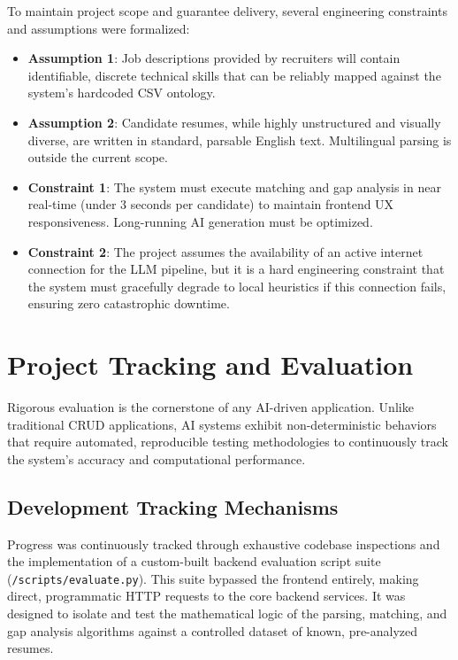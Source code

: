 \documentclass[12pt,a4paper]{report}
\begin{document}
To maintain project scope and guarantee delivery, several engineering constraints and assumptions were formalized:
\begin{itemize}
    \item \textbf{Assumption 1}: Job descriptions provided by recruiters will contain identifiable, discrete technical skills that can be reliably mapped against the system's hardcoded CSV ontology.
    \item \textbf{Assumption 2}: Candidate resumes, while highly unstructured and visually diverse, are written in standard, parsable English text. Multilingual parsing is outside the current scope.
    \item \textbf{Constraint 1}: The system must execute matching and gap analysis in near real-time (under 3 seconds per candidate) to maintain frontend UX responsiveness. Long-running AI generation must be optimized.
    \item \textbf{Constraint 2}: The project assumes the availability of an active internet connection for the LLM pipeline, but it is a hard engineering constraint that the system must gracefully degrade to local heuristics if this connection fails, ensuring zero catastrophic downtime.
\end{itemize}

\chapter{Project Tracking and Evaluation}

Rigorous evaluation is the cornerstone of any AI-driven application. Unlike traditional CRUD applications, AI systems exhibit non-deterministic behaviors that require automated, reproducible testing methodologies to continuously track the system's accuracy and computational performance.

\section{Development Tracking Mechanisms}

Progress was continuously tracked through exhaustive codebase inspections and the implementation of a custom-built backend evaluation script suite (\texttt{/scripts/evaluate.py}). This suite bypassed the frontend entirely, making direct, programmatic HTTP requests to the core backend services. It was designed to isolate and test the mathematical logic of the parsing, matching, and gap analysis algorithms against a controlled dataset of known, pre-analyzed resumes.
\end{document}
